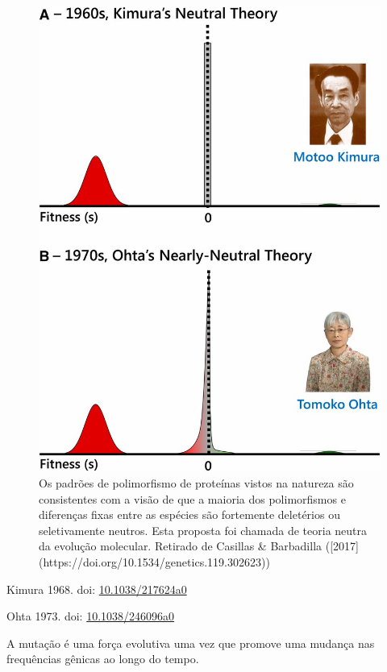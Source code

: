 \documentclass[
]{book}
\begin{document}
\begin{figure}

{\centering \includegraphics[width=600px]{figs/neutral_theory} 

}

\caption{Os padrões de polimorfismo de proteínas vistos na natureza são consistentes com a visão de que a maioria dos polimorfismos e diferenças fixas entre as espécies são fortemente deletérios ou seletivamente neutros. Esta proposta foi chamada de teoria neutra da evolução molecular. Retirado de Casillas & Barbadilla ([2017](https://doi.org/10.1534/genetics.119.302623))}\label{fig:neutraltheory}
\end{figure}

Kimura 1968. doi: \href{https://doi.org/10.1038/217624a0}{10.1038/217624a0}

Ohta 1973. doi: \href{https://doi.org/10.1038/217624a0}{10.1038/246096a0}

A mutação é uma força evolutiva uma vez que promove uma mudança nas frequências gênicas ao longo do tempo.
\end{document}
